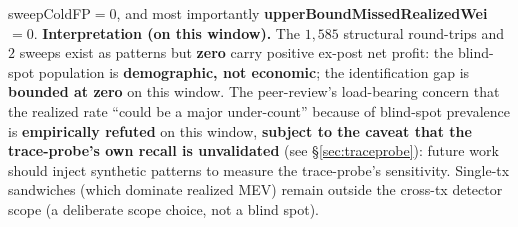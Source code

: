\documentclass[11pt]{article}
\begin{document}
\begin{itemize}
    sweepColdFP$=0$, and most importantly \textbf{upperBoundMissedRealizedWei$=0$}.
    \textbf{Interpretation (on this window).} The $1{,}585$ structural round-trips and
    $2$ sweeps exist as patterns but \textbf{zero} carry positive ex-post net profit:
    the blind-spot population is \textbf{demographic, not economic}; the identification
    gap is \textbf{bounded at zero} on this window. The peer-review's load-bearing
    concern that the realized rate ``could be a major under-count'' because of
    blind-spot prevalence is \textbf{empirically refuted} on this window, \textbf{subject
    to the caveat that the trace-probe's own recall is unvalidated} (see
    \S\ref{sec:traceprobe}): future work should inject synthetic patterns to measure the
    trace-probe's sensitivity. Single-tx
    sandwiches (which dominate realized MEV) remain outside the cross-tx detector
    scope (a deliberate scope choice, not a blind spot).
\end{itemize}
\end{document}
